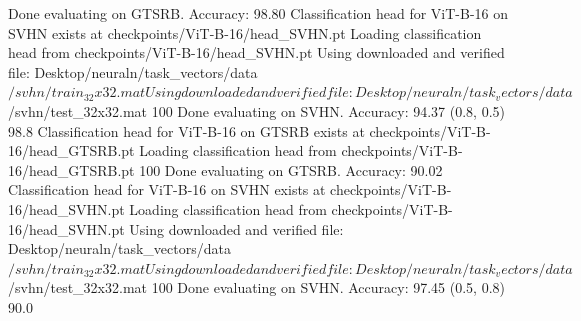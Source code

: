 Done evaluating on GTSRB. Accuracy: 98.80%
Classification head for ViT-B-16 on SVHN exists at checkpoints/ViT-B-16/head_SVHN.pt
Loading classification head from checkpoints/ViT-B-16/head_SVHN.pt
Using downloaded and verified file: Desktop/neuraln/task_vectors/data$/svhn/train_32x32.mat
Using downloaded and verified file: Desktop/neuraln/task_vectors/data$/svhn/test_32x32.mat
100%
Done evaluating on SVHN. Accuracy: 94.37%
  (0.8, 0.5)        98.8%
Classification head for ViT-B-16 on GTSRB exists at checkpoints/ViT-B-16/head_GTSRB.pt
Loading classification head from checkpoints/ViT-B-16/head_GTSRB.pt
100%
Done evaluating on GTSRB. Accuracy: 90.02%
Classification head for ViT-B-16 on SVHN exists at checkpoints/ViT-B-16/head_SVHN.pt
Loading classification head from checkpoints/ViT-B-16/head_SVHN.pt
Using downloaded and verified file: Desktop/neuraln/task_vectors/data$/svhn/train_32x32.mat
Using downloaded and verified file: Desktop/neuraln/task_vectors/data$/svhn/test_32x32.mat
100%
Done evaluating on SVHN. Accuracy: 97.45%
  (0.5, 0.8)        90.0%

